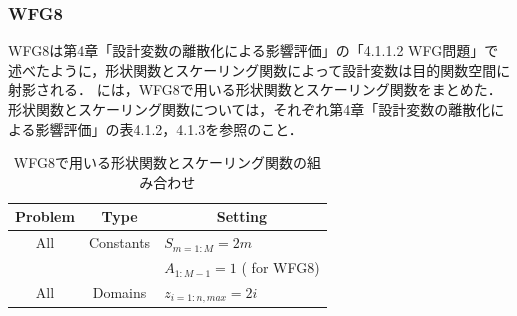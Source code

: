 \documentclass[../main/main]{subfiles}
\begin{document}
\clearpage

\subsubsection{WFG8}
WFG8は第4章「設計変数の離散化による影響評価」の「4.1.1.2 WFG問題」で述べたように，形状関数とスケーリング関数によって設計変数は目的関数空間に射影される．
には，WFG8で用いる形状関数とスケーリング関数をまとめた．
形状関数とスケーリング関数については，それぞれ第4章「設計変数の離散化による影響評価」の表4.1.2，4.1.3を参照のこと．

\begin{table}[htbp]
\fontsize{10pt}{10pt} \selectfont
\centering
\caption{WFG8で用いる形状関数とスケーリング関数の組み合わせ}
\label{wfg8_comb}
\begin{tabular}{|c||c|l|}
\hline
Problem & Type & \multicolumn{1}{c|}{Setting}\\
\hline
All & Constants & $S_{m=1:M} = 2m$\\
&                       & $A_{1:M-1} = 1$ ( for WFG8)\\
\hline
All & Domains & $z_{i = 1:n,max} = 2i$\\
\hline

\end{tabular}
\end{table}
\end{document}
